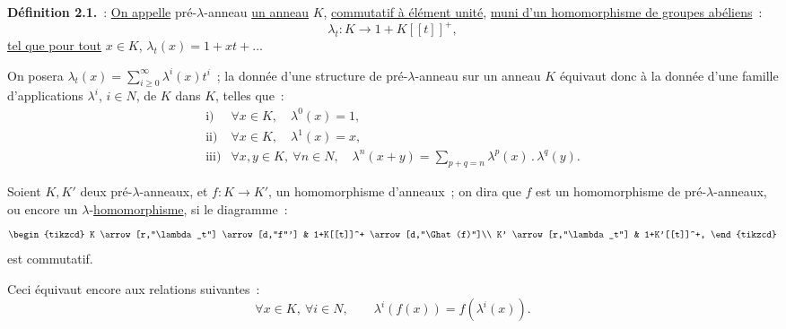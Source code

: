 
\textbf{Définition 2.1.}~: \uline{On appelle} pré-\(\lambda\)-anneau \uline{un anneau} \(K\), \uline{commutatif à élément unité}, \uline{muni d'un homomorphisme de groupes abéliens}~:
\[
  \lambda_t:K\longrightarrow1+K[[t]]^+,
\]
\uline{tel que pour tout} \(x\in K\), \(\lambda_t(x)=1+xt+\ldots\)

On posera \(\lambda_t(x)=\sum_{i\geq0}^{\infty}\lambda^i(x)t^i\)~; la donnée d'une structure de pré-\(\lambda\)-anneau sur un anneau \(K\) équivaut donc à la donnée d'une famille d'applications \(\lambda^i\), \(i\in N\), de \(K\) dans \(K\), telles que~:
\[
\begin{array}{ll}
\text{i)}& \forall x\in K,\quad \lambda^0(x)=1,\\[0.3em]
\text{ii)}& \forall x\in K,\quad \lambda^1(x)=x,\\[0.3em]
\text{iii)}& \forall x,y\in K,\ \forall n\in N,\quad
\lambda^n(x+y)=\displaystyle\sum_{p+q=n}\lambda^p(x)\mathbin{.}\lambda^q(y).
\end{array}
\]

Soient \(K,K'\) deux pré-\(\lambda\)-anneaux, et \(f:K\to K'\), un homomorphisme d'anneaux~; on dira que \(f\) est un homomorphisme de pré-\(\lambda\)-anneaux, ou encore un \(\lambda\)-\uline{homomorphisme}, si le diagramme~:
\[
\begin{tikzcd}
K \arrow[r,"\lambda_t"] \arrow[d,"f"'] &
1+K[[t]]^+ \arrow[d,"\Ghat(f)"]\\
K' \arrow[r,"\lambda_t"] &
1+K'[[t]]^+,
\end{tikzcd}
\]
est commutatif.

Ceci équivaut encore aux relations suivantes~:
\[
  \forall x\in K,\ \forall i\in N,\qquad
  \lambda^i(f(x))=f(\lambda^i(x)).
\]


